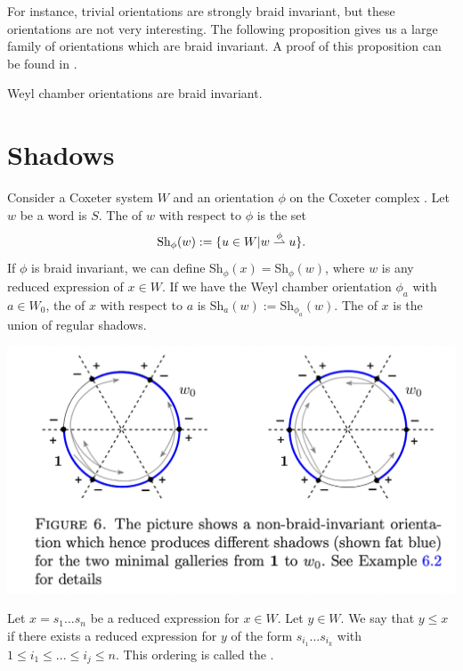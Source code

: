 \documentclass[11pt]{article}
\begin{document}
For instance, trivial orientations are strongly braid invariant, but these orientations are not very interesting. The following proposition gives us a large family of orientations which are braid invariant. A proof of this proposition can be found in \cite[pp.135-138]{SHA}.

\begin{proposition}
    Weyl chamber orientations are braid invariant.
\end{proposition}


\section{Shadows}
\begin{definition}
    Consider a Coxeter system $W$ and an orientation $\phi$ on the Coxeter complex \sg\W. Let $w$ be a word is $S$. The  of $w$ with respect to $\phi$ is the set 
    \[\textnormal{Sh}_\phi(w):=\{u\in W|w\stackrel{\phi}{\rightharpoonup} u\}.\]
    If $\phi$ is braid invariant, we can define Sh$_\phi(x)=$Sh$_\phi(w)$, where $w$ is any reduced expression of $x\in W$. If we have the Weyl chamber orientation $\phi_a$ with $a\in W_0$, the  of $x$ with respect to $a$ is Sh$_a(w):=$Sh$_{\phi_a}(w)$. The  of $x$ is the union of regular shadows. 
\end{definition}

\includegraphics[scale=0.6]{Screenshot 2023-02-08 at 10.39.18.png}\\

\begin{definition}
    Let $x=s_1...s_n$ be a reduced expression for $x\in W$. Let $y\in W$. We say that $y\leq x$ if there exists a reduced expression for $y$ of the form $s_{i_1}...s_{i_k}$ with $1\leq i_1\leq...\leq i_j\leq n$. This ordering is called the .
\end{definition}
\end{document}
